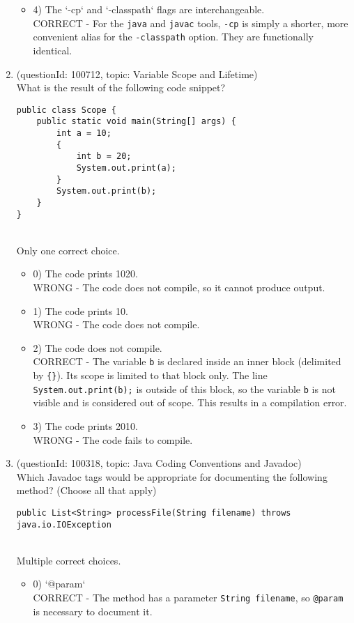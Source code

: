 \documentclass[12pt]{article}
\begin{document}
\begin{enumerate}[label=(\arabic*)]
\begin{itemize}
\item 4) The `-cp` and `-classpath` flags are interchangeable.
 \\ 
CORRECT - For the \verb|java| and \verb|javac| tools, \verb|-cp| is simply a shorter, more convenient alias for the \verb|-classpath| option. They are functionally identical.

\end{itemize}
\item (questionId: 100712, topic: Variable Scope and Lifetime) \\ 
What is the result of the following code snippet?\n\begin{verbatim}
public class Scope {
    public static void main(String[] args) {
        int a = 10;
        {
            int b = 20;
            System.out.print(a);
        }
        System.out.print(b);
    }
}
\end{verbatim}
\\ \noindent Only one correct choice. 
\begin{itemize}
\item 0) The code prints 1020.
 \\ 
WRONG - The code does not compile, so it cannot produce output.

\item 1) The code prints 10.
 \\ 
WRONG - The code does not compile.

\item 2) The code does not compile.
 \\ 
CORRECT - The variable \verb|b| is declared inside an inner block (delimited by \verb|{}|). Its scope is limited to that block only. The line \verb|System.out.print(b);| is outside of this block, so the variable \verb|b| is not visible and is considered out of scope. This results in a compilation error.

\item 3) The code prints 2010.
 \\ 
WRONG - The code fails to compile.

\end{itemize}
\item (questionId: 100318, topic: Java Coding Conventions and Javadoc) \\ 
Which Javadoc tags would be appropriate for documenting the following method? (Choose all that apply)
\begin{verbatim}
public List<String> processFile(String filename) throws java.io.IOException
\end{verbatim}
\\ \noindent Multiple correct choices. 
\begin{itemize}
\item 0) `@param`
 \\ 
CORRECT - The method has a parameter \verb|String filename|, so \verb|@param| is necessary to document it.


\end{itemize}
\end{enumerate}
\end{document}
